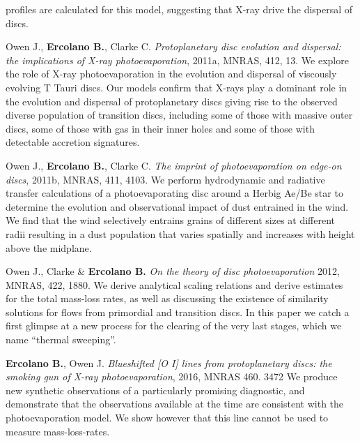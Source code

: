 \documentclass[10pt,fleqn,twoside]{article}
\begin{document}
\begin{literature}
profiles are calculated for this model, suggesting that X-ray drive
the dispersal of discs. 
\item Owen J., \textbf{Ercolano B.}, Clarke C.  \textit{
  Protoplanetary disc evolution and dispersal: the implications of X-ray photoevaporation}, 2011a, MNRAS, 412, 13.
  We explore the role of X-ray photoevaporation in the evolution and
  dispersal of viscously evolving T Tauri discs. Our models confirm
  that X-rays play a dominant role in the evolution and dispersal of
  protoplanetary discs giving rise to the observed diverse population
  of transition discs, including some of those with massive outer
  discs, some of those
  with gas in their inner holes and some of those with detectable accretion
  signatures.  
\item Owen J., \textbf{Ercolano B.}, Clarke C.  \textit{
    The imprint of photoevaporation on edge-on discs}, 2011b, MNRAS, 411, 4103.
  We perform hydrodynamic and radiative transfer calculations of a
  photoevaporating disc around a Herbig Ae/Be star to determine the
  evolution and observational impact of dust entrained in the wind. We
  find that the wind selectively entrains grains of different sizes at
  different radii resulting in a dust population that varies spatially
  and increases with height above the midplane.
\item Owen J., Clarke \& \textbf{Ercolano B.}  \textit{On the theory of disc photoevaporation}
  2012, MNRAS, 422, 1880. We derive analytical scaling relations and
  derive estimates for the total mass-loss rates, as well as
  discussing the existence of similarity solutions for flows from
  primordial and transition discs. In this paper we catch a first
  glimpse at a new process for the clearing of the very last stages,
  which we name ``thermal sweeping''.
\item \textbf{Ercolano B.}, Owen J.  {\em Blueshifted [O I] lines from
    protoplanetary discs: the smoking gun of X-ray photoevaporation},
  2016, MNRAS 460. 3472
  We produce new synthetic observations of a particularly promising
  diagnostic, and demonstrate that the observations available at the
  time \citep[before][]{2016ApJ...831..169S} are consistent with the
  photoevaporation model. We show however that this line cannot be
  used to measure mass-loss-rates. 
\end{literature}


%
%
%
%
%
%
%
\end{document}
